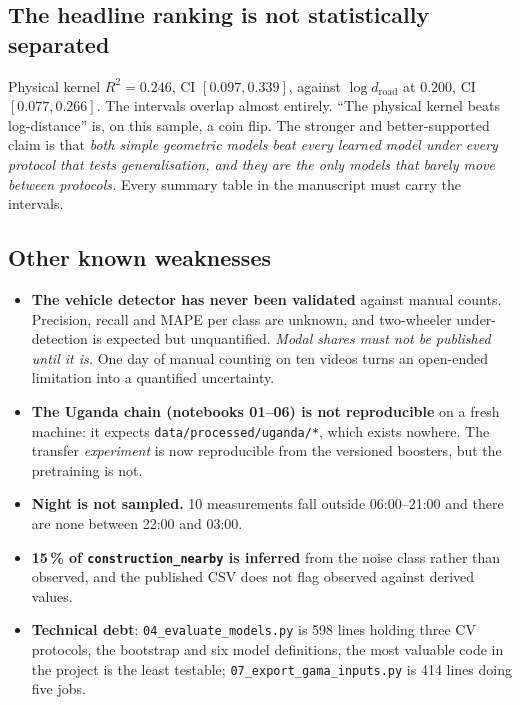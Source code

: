 \documentclass[11pt,a4paper]{article}
\newcommand{\pth}[1]{\texttt{\small #1}}
\begin{document}
\subsection{The headline ranking is not statistically separated}\label{sec:ci}

Physical kernel $R^2 = 0.246$, CI $[0.097, 0.339]$, against
$\log d_{\text{road}}$ at $0.200$, CI $[0.077, 0.266]$. The intervals overlap
almost entirely. ``The physical kernel beats log-distance'' is, on this sample, a
coin flip. The stronger and better-supported claim is that \emph{both
simple geometric models beat every learned model under every protocol that tests
generalisation, and they are the only models that barely move between
protocols.} Every summary table in the manuscript must carry the intervals.

\subsection{Other known weaknesses}

\begin{itemize}
 \item \textbf{The vehicle detector has never been validated} against manual
 counts. Precision, recall and MAPE per class are unknown, and
 two-wheeler under-detection is expected but unquantified. \emph{Modal
 shares must not be published until it is.} One day of manual counting on
 ten videos turns an open-ended limitation into a quantified uncertainty.
 \item \textbf{The Uganda chain (notebooks 01--06) is not reproducible} on a
 fresh machine: it expects \pth{data/processed/uganda/*}, which exists
 nowhere. The transfer \emph{experiment} is now reproducible from the
 versioned boosters, but the pretraining is not.
 \item \textbf{Night is not sampled.} 10 measurements fall outside 06:00--21:00
 and there are none between 22:00 and 03:00.
 \item \textbf{15\,\% of \pth{construction\_nearby} is inferred} from the noise
 class rather than observed, and the published CSV does not flag observed
 against derived values.
 \item \textbf{Technical debt}: \pth{04\_evaluate\_models.py} is 598 lines
 holding three CV protocols, the bootstrap and six model definitions, the most valuable code in the project is the least testable;
 \pth{07\_export\_gama\_inputs.py} is 414 lines doing five jobs.
\end{itemize}
\end{document}
